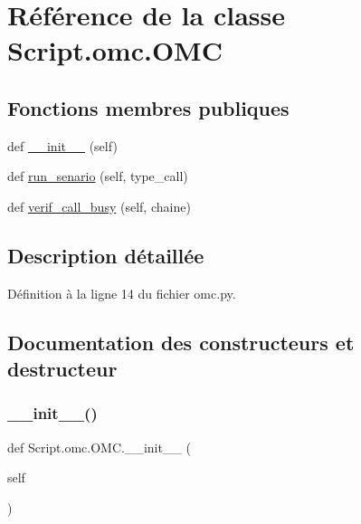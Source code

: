 \hypertarget{classScript_1_1omc_1_1OMC}{}\section{Référence de la classe Script.\+omc.\+O\+MC}
\label{classScript_1_1omc_1_1OMC}
\subsection*{Fonctions membres publiques}
\begin{DoxyCompactItemize}
\item 
def \hyperlink{classScript_1_1omc_1_1OMC_aa3c241e906a6b92a02bcf19c23237f9f}{\+\_\+\+\_\+init\+\_\+\+\_\+} (self)
\item 
def \hyperlink{classScript_1_1omc_1_1OMC_a8446de2325ea79f5574f2822da38b5cf}{run\+\_\+senario} (self, type\+\_\+call)
\item 
def \hyperlink{classScript_1_1omc_1_1OMC_ab6343718d0b1413540880ece035578f7}{verif\+\_\+call\+\_\+busy} (self, chaine)
\end{DoxyCompactItemize}


\subsection{Description détaillée}


Définition à la ligne 14 du fichier omc.\+py.



\subsection{Documentation des constructeurs et destructeur}
\mbox{\label{classScript_1_1omc_1_1OMC_aa3c241e906a6b92a02bcf19c23237f9f}} 
\subsubsection{\texorpdfstring{\+\_\+\+\_\+init\+\_\+\+\_\+()}{\_\_init\_\_()}}
{\footnotesize\ttfamily def Script.\+omc.\+O\+M\+C.\+\_\+\+\_\+init\+\_\+\+\_\+ (\begin{DoxyParamCaption}\item[{}]{self }\end{DoxyParamCaption})}



